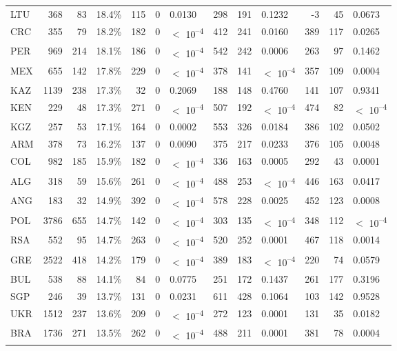 \begin{tabular}[t]{lrrlrrlrrlrrl}
LTU & 368 & 83 & 18.4\% & 115 & 0 & 0.0130 & 298 & 191 & 0.1232 & -3 & 45 & 0.0673\\
CRC & 355 & 79 & 18.2\% & 182 & 0 & $<$ 10\textsuperscript{--4} & 412 & 241 & 0.0160 & 389 & 117 & 0.0265\\
PER & 969 & 214 & 18.1\% & 186 & 0 & $<$ 10\textsuperscript{--4} & 542 & 242 & 0.0006 & 263 & 97 & 0.1462\\
MEX & 655 & 142 & 17.8\% & 229 & 0 & $<$ 10\textsuperscript{--4} & 378 & 141 & $<$ 10\textsuperscript{--4} & 357 & 109 & 0.0004\\
KAZ & 1139 & 238 & 17.3\% & 32 & 0 & 0.2069 & 188 & 148 & 0.4760 & 141 & 107 & 0.9341\\
KEN & 229 & 48 & 17.3\% & 271 & 0 & $<$ 10\textsuperscript{--4} & 507 & 192 & $<$ 10\textsuperscript{--4} & 474 & 82 & $<$ 10\textsuperscript{--4}\\
KGZ & 257 & 53 & 17.1\% & 164 & 0 & 0.0002 & 553 & 326 & 0.0184 & 386 & 102 & 0.0502\\
ARM & 378 & 73 & 16.2\% & 137 & 0 & 0.0090 & 375 & 217 & 0.0233 & 376 & 105 & 0.0048\\
COL & 982 & 185 & 15.9\% & 182 & 0 & $<$ 10\textsuperscript{--4} & 336 & 163 & 0.0005 & 292 & 43 & 0.0001\\
ALG & 318 & 59 & 15.6\% & 261 & 0 & $<$ 10\textsuperscript{--4} & 488 & 253 & $<$ 10\textsuperscript{--4} & 446 & 163 & 0.0417\\
ANG & 183 & 32 & 14.9\% & 392 & 0 & $<$ 10\textsuperscript{--4} & 578 & 228 & 0.0025 & 452 & 123 & 0.0008\\
POL & 3786 & 655 & 14.7\% & 142 & 0 & $<$ 10\textsuperscript{--4} & 303 & 135 & $<$ 10\textsuperscript{--4} & 348 & 112 & $<$ 10\textsuperscript{--4}\\
RSA & 552 & 95 & 14.7\% & 263 & 0 & $<$ 10\textsuperscript{--4} & 520 & 252 & 0.0001 & 467 & 118 & 0.0014\\
GRE & 2522 & 418 & 14.2\% & 179 & 0 & $<$ 10\textsuperscript{--4} & 389 & 183 & $<$ 10\textsuperscript{--4} & 220 & 74 & 0.0579\\
BUL & 538 & 88 & 14.1\% & 84 & 0 & 0.0775 & 251 & 172 & 0.1437 & 261 & 177 & 0.3196\\
SGP & 246 & 39 & 13.7\% & 131 & 0 & 0.0231 & 611 & 428 & 0.1064 & 103 & 142 & 0.9528\\
UKR & 1512 & 237 & 13.6\% & 209 & 0 & $<$ 10\textsuperscript{--4} & 272 & 123 & 0.0001 & 131 & 35 & 0.0182\\
BRA & 1736 & 271 & 13.5\% & 262 & 0 & $<$ 10\textsuperscript{--4} & 488 & 211 & 0.0001 & 381 & 78 & 0.0004\\

\end{tabular}
